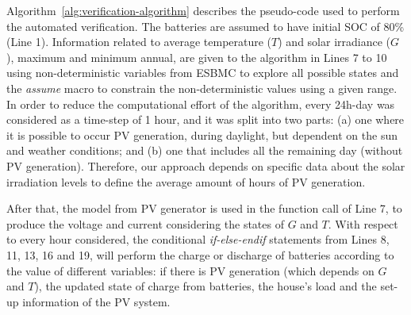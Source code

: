 \documentclass[runningheads]{llncs}
\begin{document}
Algorithm~\ref{alg:verification-algorithm} describes the pseudo-code used to perform the automated verification. The batteries are assumed to have initial SOC of 80\% (Line 1). Information related to average temperature ($T$) and solar irradiance ($G$), maximum and minimum annual, are given to the algorithm in Lines 7 to 10 using non-deterministic variables from ESBMC to explore all possible states and the \textit{assume} macro to constrain the non-deterministic values using a given range. In order to reduce the computational effort of the algorithm, every 24h-day was considered as a time-step of 1 hour, and it was split into two parts: (a) one where it is possible to occur PV generation, during daylight, but dependent on the sun and weather conditions; and (b) one that includes all the remaining day (without PV generation). Therefore, our approach depends on specific data about the solar irradiation levels to define the average amount of hours of PV generation.

After that, the model from PV generator is used in the function call of Line 7, to produce the voltage and current considering the states of $G$ and $T$. With respect to every hour considered, the conditional \textit{if-else-endif} statements from Lines 8, 11, 13, 16 and 19, will perform the charge or discharge of batteries according to the value of different variables: if there is PV generation (which depends on $G$ and $T$), the updated state of charge from batteries, the house's load and the set-up information of the PV system.
\end{document}
